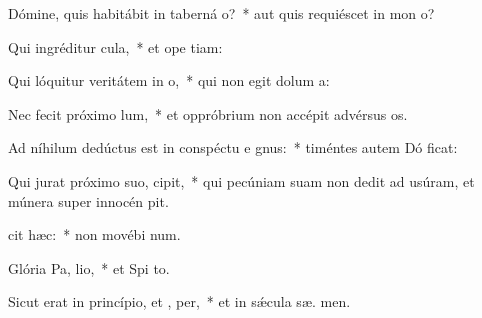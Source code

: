 \item Dómine, quis habitábit in taberná o?~* aut quis requiéscet in mon  o?
\item Qui ingréditur  cula,~* et ope tiam:
\item Qui lóquitur veritátem in  o,~* qui non egit dolum   a:
\item Nec fecit próximo  lum,~* et oppróbrium non accépit advérsus  os.
\item Ad níhilum dedúctus est in conspéctu e gnus:~* timéntes autem Dó ficat:
\item Qui jurat próximo suo,   cipit,~* qui pecúniam suam non dedit ad usúram, et múnera super innocén  pit.
\item {} cit hæc:~* non movébi  num.
\item Glória Pa,  lio,~* et Spi to.
\item Sicut erat in princípio, et ,  per,~* et in sǽcula sæ. men.
